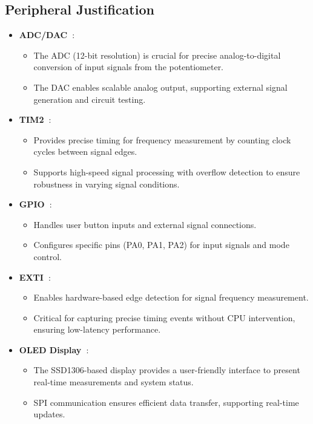 \subsection{Peripheral Justification}
\begin{itemize}
    \item \textbf{ADC/DAC~\cite{interfacex}}: 
        \begin{itemize}
            \item The ADC (12-bit resolution) is crucial for precise analog-to-digital conversion of input signals from the potentiometer.
            \item The DAC enables scalable analog output, supporting external signal generation and circuit testing.
        \end{itemize}
    \item \textbf{TIM2~\cite{iox}}:
        \begin{itemize}
            \item Provides precise timing for frequency measurement by counting clock cycles between signal edges.
            \item Supports high-speed signal processing with overflow detection to ensure robustness in varying signal conditions.
        \end{itemize}
    \item \textbf{GPIO~\cite{iox}}:
        \begin{itemize}
            \item Handles user button inputs and external signal connections.
            \item Configures specific pins (PA0, PA1, PA2) for input signals and mode control.
        \end{itemize}
    \item \textbf{EXTI~\cite{iox}}: 
        \begin{itemize}
            \item Enables hardware-based edge detection for signal frequency measurement.
            \item Critical for capturing precise timing events without CPU intervention, ensuring low-latency performance.
        \end{itemize}
    \item \textbf{OLED Display~\cite{interfacex}}: 
        \begin{itemize}
            \item The SSD1306-based display provides a user-friendly interface to present real-time measurements and system status.
            \item SPI communication ensures efficient data transfer, supporting real-time updates.
        \end{itemize}
\end{itemize}
